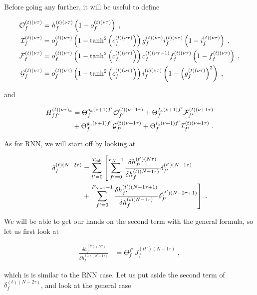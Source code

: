 \begin{subappendices}
Before going any further, it will be useful to define

\begin{align}
\mathcal{O}^{(t)(\nu\tau)}_{f}&=h^{(t)(\nu\tau)}_{f}
%
\left(1-o^{(t)(\nu\tau)}_{f}\right)\;,\notag\\
%
\mathcal{I}^{(t)(\nu\tau)}_{f}&=o^{(t)(\nu\tau)}_{f}\left(1-\tanh^2\left(c^{(t)(\nu\tau)}_{f}\right)
%
\right)g^{(t)(\nu\tau)}_{f} i^{(t)(\nu\tau)}_{f}\left(1-i^{(t)(\nu\tau)}_{f}\right)\;,\notag\\
%
\mathcal{F}^{(t)(\nu\tau)}_{f}&=o^{(t)(\nu\tau)}_{f}\left(1-\tanh^2\left(c^{(t)(\nu\tau)}_{f}\right)
%
\right)c^{(t)(\nu\tau-1)}_{f} f^{(t)(\nu\tau)}_{f}\left(1-f^{(t)(\nu\tau)}_{f}\right)\;,\notag\\
%
\mathcal{G}^{(t)(\nu\tau)}_{f}&=o^{(t)(\nu\tau)}_{f}\left(1-\tanh^2\left(c^{(t)(\nu\tau)}_{f}\right)
%
\right)i^{(t)(\nu\tau)}_{f}\left(1-\left(g^{(t)(\nu\tau)}_{f}\right)^2\right)\;,
\end{align}

and

\begin{align}
H^{(t)(\nu\tau)_a}_{ff'}&=\Theta^{o_a(\nu+1)f'}_{f}\mathcal{O}^{(t)(\nu+1\tau)}_{f'}
%
+\Theta^{f_a(\nu+1)f'}_{f}\mathcal{F}^{(t)(\nu+1\tau)}_{f'}\notag\\
%
&+\Theta^{g_a(\nu+1)f'}_{f}\mathcal{G}^{(t)(\nu+1\tau)}_{f'}
%
+\Theta^{i_a(\nu+1)f'}_{f}\mathcal{I}^{(t)(\nu+1\tau)}_{f'}\;.
\end{align}

As for RNN, we will start off by looking at

\begin{align}
\delta^{(t)(N-2\tau)}_f&= \sum_{t'=0}^{T_{{\rm mb}}}\left[\sum_{f'=0}^{F_{N}-1}
%
\frac{\delta h^{(t')(N\tau)}_{f'}}{\delta h^{(t)(N-1\tau)}_f }\delta^{(t')(N-1\tau)}_{f'}\right.\notag\\
%
&+\left.\sum_{f'=0}^{F_{N-1}-1}\frac{\delta h^{(t')(N-1\tau+1)}_{f'}}{\delta h^{(t)(N-1\tau)}_f }\delta^{(t')(N-2\tau+1)}_{f'}\right]\;.
\end{align}

We will be able to get our hands on the second term with the general formula, so let us first look at

\begin{align}
\frac{\delta h^{(t')(N\tau)}_{f'}}{\delta h^{(t)(N-1\tau)}_f }&=\Theta^{f'}_{f}\,J_f^{(tt')(N-1\tau)}\;,
\end{align}

which is is similar to the RNN case. Let us put aside the second term of $\delta^{(t)(N-2\tau)}_f$, and look at the general case


\end{subappendices}
